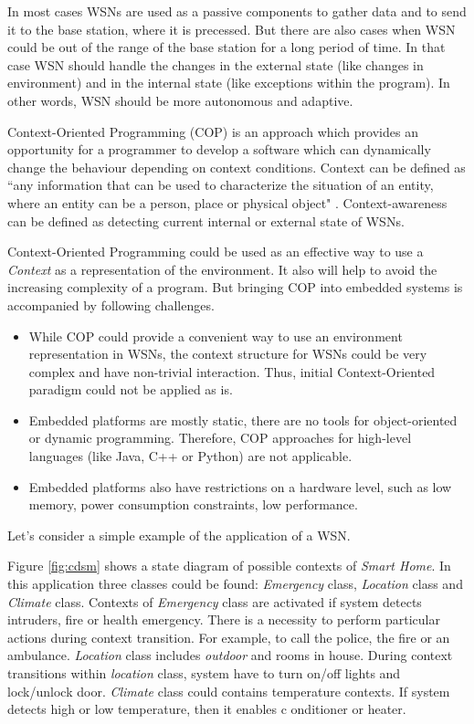 \documentclass{ubicomp-ext}
\begin{document}
In most cases WSNs are used as a passive components to gather data and to send it to the base station, where it is precessed. But there are also cases when WSN could be out of the range of the base station for a long period of time. In that case WSN should handle the changes in the external state (like changes in environment) and in the internal state (like exceptions within the program). In other words, WSN should be more autonomous and adaptive.

Context-Oriented Programming (COP) \cite{hirschfeld08} is an approach which provides an opportunity for a programmer to develop a software which can dynamically change the behaviour depending on context conditions. Context can be defined as ``any information that can be used to characterize the situation of an entity, where an entity can be a person, place or physical object" \cite{dey99}. Context-awareness can be defined as detecting current internal or external state of WSNs.

Context-Oriented Programming could be used as an effective way to use a \textit{Context} as a representation of the environment. It also will help to avoid the increasing complexity of a program. But bringing COP into embedded systems is accompanied by following challenges.

\begin{itemize}\compresslist
\item
While COP could provide a convenient way to use an environment representation in WSNs, the context structure for WSNs could be very complex and have non-trivial interaction. Thus, initial Context-Oriented paradigm could not be applied as is.
\item
Embedded platforms are mostly static, there are no tools for object-oriented or dynamic programming. Therefore, COP approaches for high-level languages (like Java, C++ or Python) are not applicable. 
\item
Embedded platforms also have restrictions on a hardware level, such as low memory, power consumption constraints, low performance.
\end{itemize}

Let's consider a simple example of the application of a WSN. 

Figure \ref{fig:cdsm} shows a state diagram of possible contexts of \textit{Smart Home}. In this application three classes could be found: \textit{Emergency} class, \textit{Location} class and \textit{Climate} class. Contexts of \textit{Emergency} class are activated if system detects intruders, fire or health emergency. There is a necessity to perform particular actions during context transition. For example, to call the police, the fire or an ambulance. \textit{Location} class includes \textit{outdoor} and rooms in house. During context transitions within \textit{location} class, system have to turn on/off lights and lock/unlock door. \textit{Climate} class could contains temperature contexts. If system detects high or low temperature, then it enables c
onditioner or heater.
\end{document}
